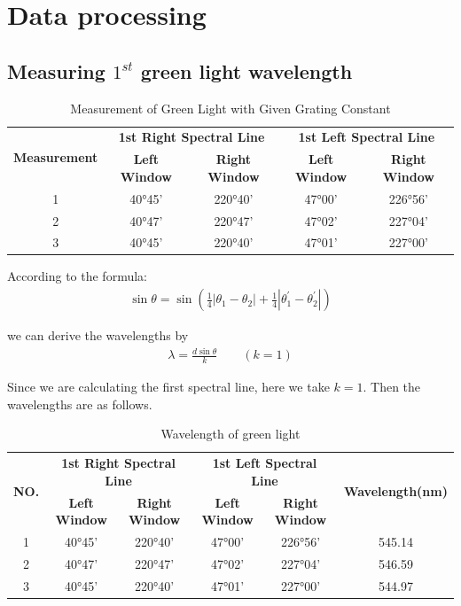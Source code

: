 \documentclass[UTF8]{article}
\begin{document}
	
	\section{Data processing}
   \subsection{Measuring $1^{st}$ green light wavelength}
       

	
	\begin{table}[htbp]
	  \centering
	  \caption{Measurement of Green Light with Given Grating Constant}
	  \begin{tabular}{ccccc}
	    \toprule[2pt]
	    \multirow{2}{*}{\textbf{Measurement}} & \multicolumn{2}{c}{\textbf{1st Right Spectral Line}} & \multicolumn{2}{c}{\textbf{1st Left Spectral Line}} \\
	    \cline{2-5}
	    & \textbf{Left Window} & \textbf{Right Window} &  \textbf{Left Window} & \textbf{Right Window}\\
	    \midrule
	    1 & 40°45' & 220°40' & 47°00' & 226°56' \\
	    2 & 40°47' & 220°47' & 47°02' & 227°04' \\
	    3 & 40°45' & 220°40' & 47°01' & 227°00' \\
	    \bottomrule[2pt]
	  \end{tabular}
	\end{table}
	
	According to the formula:
	\begin{eqnarray}
	\sin \theta = \sin (\frac{1}{4}\left | \theta_1 - \theta_2 \right | + \frac{1}{4}\left | \theta_1^{'} - \theta_2^{'} \right |)
	\end{eqnarray}
	
	we can derive the wavelengths by
	\begin{eqnarray}
	\lambda = \frac{d\sin \theta}{k} \qquad (k = 1)
	\end{eqnarray}
	
	Since we are calculating the first spectral line, here we take $k = 1$. Then the wavelengths are as follows.

	\begin{table}[htbp]
	  \centering
	  \caption{Wavelength of green light}
	  \begin{tabular}{cccccc}
	    \toprule[2pt]
	    \multirow{2}{*}{\textbf{NO.}} & \multicolumn{2}{c}{\textbf{1st Right Spectral Line}} & \multicolumn{2}{c}{\textbf{1st Left Spectral Line}} &  \multirow{2}{*}{\textbf{Wavelength(nm)}}\\
	    \cline{2-5}
	    & \textbf{Left Window} & \textbf{Right Window} &  \textbf{Left Window} & \textbf{Right Window}&\\
	    \midrule
	    1 & 40°45' & 220°40' & 47°00' & 226°56' & 545.14\\
	    2 & 40°47' & 220°47' & 47°02' & 227°04' & 546.59\\
	    3 & 40°45' & 220°40' & 47°01' & 227°00' & 544.97\\
	    \bottomrule[2pt]
	  \end{tabular}
	\end{table}
	
\end{document}
